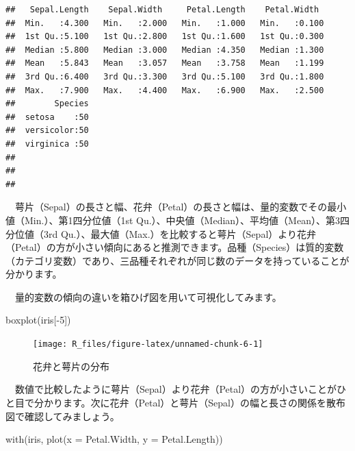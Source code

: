 \documentclass[
  12pt,
]{book}
\newenvironment{Shaded}{\begin{snugshade}}{\end{snugshade}}
\newcommand{\AttributeTok}[1]{\textcolor[rgb]{0.77,0.63,0.00}{#1}}
\newcommand{\DecValTok}[1]{\textcolor[rgb]{0.00,0.00,0.81}{#1}}
\newcommand{\FunctionTok}[1]{\textcolor[rgb]{0.00,0.00,0.00}{#1}}
\newcommand{\NormalTok}[1]{#1}
\newcommand{\SpecialCharTok}[1]{\textcolor[rgb]{0.00,0.00,0.00}{#1}}
\begin{document}
\begin{verbatim}
##   Sepal.Length    Sepal.Width     Petal.Length    Petal.Width   
##  Min.   :4.300   Min.   :2.000   Min.   :1.000   Min.   :0.100  
##  1st Qu.:5.100   1st Qu.:2.800   1st Qu.:1.600   1st Qu.:0.300  
##  Median :5.800   Median :3.000   Median :4.350   Median :1.300  
##  Mean   :5.843   Mean   :3.057   Mean   :3.758   Mean   :1.199  
##  3rd Qu.:6.400   3rd Qu.:3.300   3rd Qu.:5.100   3rd Qu.:1.800  
##  Max.   :7.900   Max.   :4.400   Max.   :6.900   Max.   :2.500  
##        Species  
##  setosa    :50  
##  versicolor:50  
##  virginica :50  
##                 
##                 
## 
\end{verbatim}

　萼片（Sepal）の長さと幅、花弁（Petal）の長さと幅は、量的変数でその最小値（Min.）、第1四分位値（1st Qu.）、中央値（Median）、平均値（Mean）、第3四分位値（3rd Qu.）、最大値（Max.）を比較すると萼片（Sepal）より花弁（Petal）の方が小さい傾向にあると推測できます。品種（Species）は質的変数（カテゴリ変数）であり、三品種それぞれが同じ数のデータを持っていることが分かります。

\newpage

　量的変数の傾向の違いを箱ひげ図を用いて可視化してみます。

\begin{Shaded}
\begin{Highlighting}[numbers=left,,]
\FunctionTok{boxplot}\NormalTok{(iris[}\SpecialCharTok{{-}}\DecValTok{5}\NormalTok{])}
\end{Highlighting}
\end{Shaded}

\begin{figure}[H]

{\centering \texttt{[image: R\_files/figure-latex/unnamed-chunk-6-1]} 

}

\caption{花弁と萼片の分布}\label{fig:unnamed-chunk-6}
\end{figure}

　数値で比較したように萼片（Sepal）より花弁（Petal）の方が小さいことがひと目で分かります。次に花弁（Petal）と萼片（Sepal）の幅と長さの関係を散布図で確認してみましょう。

\begin{Shaded}
\begin{Highlighting}[numbers=left,,]
\FunctionTok{with}\NormalTok{(iris, }\FunctionTok{plot}\NormalTok{(}\AttributeTok{x =}\NormalTok{ Petal.Width, }\AttributeTok{y =}\NormalTok{ Petal.Length))}
\end{Highlighting}
\end{Shaded}
\end{document}
